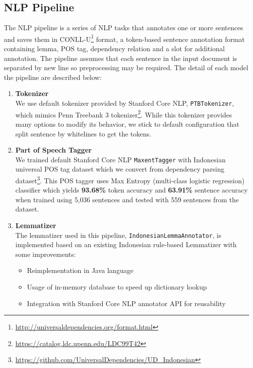 \documentclass[conference,compsoc]{IEEEtran}
\begin{document}
\subsection{NLP Pipeline}

The NLP pipeline is a series of NLP tasks that annotates one or more sentences and saves them in CONLL-U\footnote{\url{http://universaldependencies.org/format.html}} format, a token-based sentence annotation format containing lemma, POS tag, dependency relation and a slot for additional annotation. The pipeline assumes that each sentence in the input document is separated by new line so preprocessing may be required. The detail of each model the pipeline are described below:

\begin{enumerate}

\item \textbf{Tokenizer} \\
We use default tokenizer provided by Stanford Core NLP, \verb|PTBTokenizer|\cite{manningptbtokenizer}, which mimics Penn Treebank 3 tokenizer\footnote{\url{https://catalog.ldc.upenn.edu/LDC99T42}}. While this tokenizer provides many options to modify its behavior, we stick to default configuration that split sentence by whitelines to get the tokens.\\

\item \textbf{Part of Speech Tagger} \\
We trained default Stanford Core NLP \verb|MaxentTagger|\cite{toutanova2003feature} with Indonesian universal POS tag dataset which we convert from dependency parsing dataset\footnote{\url{https://github.com/UniversalDependencies/UD_Indonesian}}. This POS tagger uses Max Entropy (multi-class logistic regression) classifier which yields \textbf{93.68\%} token accuracy and \textbf{63.91\%} sentence accuracy when trained using 5,036 sentences and tested with 559 sentences from the dataset. \\

\item \textbf{Lemmatizer} \\
The lemmatizer used in this pipeline, \verb|IndonesianLemmaAnnotator|, is implemented based on an existing Indonesian rule-based Lemmatizer\cite{suhartono2014lemmatization} with some improvements:

\begin{itemize}
\item Reimplementation in Java language
\item Usage of in-memory database to speed up dictionary lookup
\item Integration with Stanford Core NLP annotator API for reusability
\end{itemize}


\end{enumerate}
\end{document}
